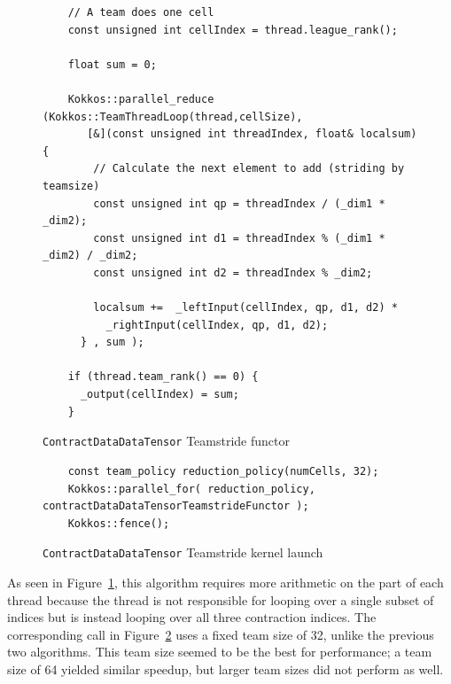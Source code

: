 \begin{figure}[ht]
    \begin{lstlisting}
    // A team does one cell
    const unsigned int cellIndex = thread.league_rank();

    float sum = 0;

    Kokkos::parallel_reduce (Kokkos::TeamThreadLoop(thread,cellSize),
       [&](const unsigned int threadIndex, float& localsum) {
        // Calculate the next element to add (striding by teamsize)
        const unsigned int qp = threadIndex / (_dim1 * _dim2);
        const unsigned int d1 = threadIndex % (_dim1 * _dim2) / _dim2;
        const unsigned int d2 = threadIndex % _dim2;
        
        localsum +=  _leftInput(cellIndex, qp, d1, d2) *
          _rightInput(cellIndex, qp, d1, d2);
      } , sum );

    if (thread.team_rank() == 0) {
      _output(cellIndex) = sum;
    }
\end{lstlisting}
\caption{\texttt{ContractDataDataTensor} Teamstride functor
\label{lst:ContractDataDataTensorTeamstrideFunctor}} 
\end{figure}

\begin{figure}[ht]
    \begin{lstlisting}
    const team_policy reduction_policy(numCells, 32);
    Kokkos::parallel_for( reduction_policy, contractDataDataTensorTeamstrideFunctor );
    Kokkos::fence();
    \end{lstlisting}
\caption{\texttt{ContractDataDataTensor} Teamstride kernel launch
\label{lst:ContractDataDataTensorTeamstrideCall}} 
\end{figure}

As seen in Figure~\ref{lst:ContractDataDataTensorTeamstrideFunctor}, this
algorithm requires more arithmetic on the part of each thread because the thread
is not responsible for looping over a single subset of indices but is instead
looping over all three contraction indices. The corresponding call in
Figure~\ref{lst:ContractDataDataTensorTeamstrideCall} uses a fixed team size of
32, unlike the previous two algorithms.  This team size seemed to be the best
for performance; a team size of 64 yielded similar speedup, but larger team
sizes did not perform as well.

